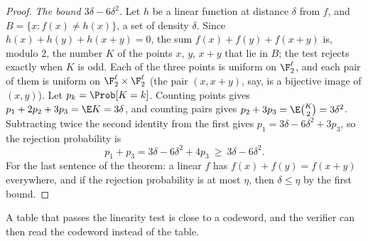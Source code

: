 \begin{refsection}
\begin{proof}
\emph{The bound $3\delta-6\delta^2$.} Let $h$ be a linear function at distance $\delta$ from $f$, and $B=\{x:f(x)\ne h(x)\}$, a set of density $\delta$. Since $h(x)+h(y)+h(x+y)=0$, the sum $f(x)+f(y)+f(x+y)$ is, modulo $2$, the number $K$ of the points $x$, $y$, $x+y$ that lie in $B$; the test rejects exactly when $K$ is odd. Each of the three points is uniform on $\F_2^\ell$, and each pair of them is uniform on $\F_2^\ell\times\F_2^\ell$ (the pair $(x,x+y)$, say, is a bijective image of $(x,y)$). Let $p_k=\Prob[K=k]$. Counting points gives $p_1+2p_2+3p_3=\E K=3\delta$, and counting pairs gives $p_2+3p_3=\E\binom K2=3\delta^2$. Subtracting twice the second identity from the first gives $p_1=3\delta-6\delta^2+3p_3$, so the rejection probability is
\[
  p_1+p_3=3\delta-6\delta^2+4p_3\ \ge\ 3\delta-6\delta^2.
\]
For the last sentence of the theorem: a linear $f$ has $f(x)+f(y)=f(x+y)$ everywhere, and if the rejection probability is at most $\eta$, then $\delta\le\eta$ by the first bound.
\end{proof}


A table that passes the linearity test is close to a codeword, and the verifier can then read the codeword instead of the table.



\end{refsection}
